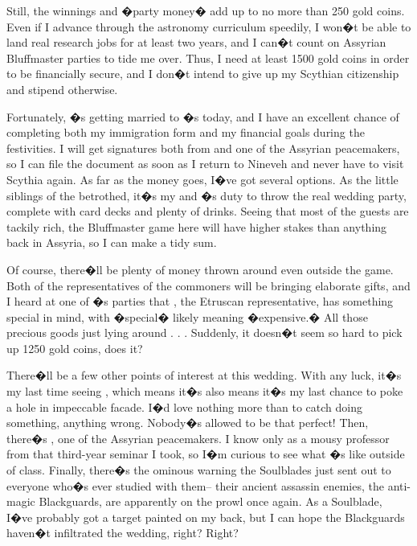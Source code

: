 \documentclass[char]{Kos}
\begin{document}
Still, the winnings and �party money� add up to no more than 250 gold coins. Even if I advance through the astronomy curriculum speedily, I won�t be able to land real research jobs for at least two years, and I can�t count on Assyrian Bluffmaster parties to tide me over. Thus, I need at least 1500 gold coins in order to be financially secure, and I don�t intend to give up my Scythian citizenship and stipend otherwise.

Fortunately, \cBride{\nickname}�s getting married to \cPoet{\nickname}�s \cGroom{\sibling} \cGroom{\nickname} today, and I have an excellent chance of completing both my immigration form and my financial goals during the festivities. I will get signatures both from \cKingTwo{\nickname} and one of the Assyrian peacemakers, so I can file the document as soon as I return to Nineveh and never have to visit Scythia again. As far as the money goes, I�ve got several options. As the little siblings of the betrothed, it�s my and \cPoet{\nickname}�s duty to throw the real wedding party, complete with card decks and plenty of drinks. Seeing that most of the guests are tackily rich, the Bluffmaster game here will have higher stakes than anything back in Assyria, so I can make a tidy sum.

Of course, there�ll be plenty of money thrown around even outside the game. Both of the representatives of the commoners will be bringing elaborate gifts, and I heard at one of \cPoet{\nickname}�s parties that \cMerchant{\nickname}, the Etruscan representative, has something special in mind, with �special� likely meaning �expensive.� All those precious goods just lying around . . . Suddenly, it doesn�t seem so hard to pick up 1250 gold coins, does it?

There�ll be a few other points of interest at this wedding. With any luck, it�s my last time seeing \cBride{\nickname}, which means it�s also means it�s my last chance to poke a hole in \cBride{\their} impeccable facade. I�d love nothing more than to catch \cBride{\them} doing something, anything wrong. Nobody�s allowed to be that perfect! Then, there�s \cAnarchist{\nickname}, one of the Assyrian peacemakers. I know \cAnarchist{\nickname} only as a mousy professor from that third-year seminar I took, so I�m curious to see what \cAnarchist{\they}�s like outside of class. Finally, there�s the ominous warning the Soulblades just sent out to everyone who�s ever studied with them-- their ancient assassin enemies, the anti-magic Blackguards, are apparently on the prowl once again. As a Soulblade, I�ve probably got a target painted on my back, but I can hope the Blackguards haven�t infiltrated the wedding, right? Right?
\end{document}
